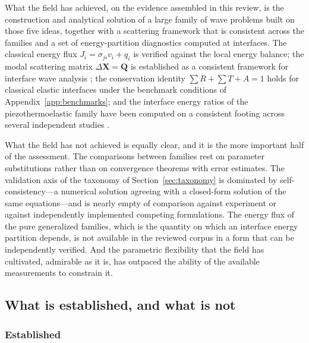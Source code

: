 What the field has achieved, on the evidence assembled in this review, is the construction and analytical solution of a large family of wave problems built on those five ideas, together with a scattering framework that is consistent across the families and a set of energy-partition diagnostics computed at interfaces. The classical energy flux $J_i = \sigma_{ji}v_i + q_i$ is verified against the local energy balance; the modal scattering matrix $\Delta\bm{X} = \bm{Q}$ is established as a consistent framework for interface wave analysis \cite{Barak2023}; the conservation identity $\sum R + \sum T + A = 1$ holds for classical elastic interfaces under the benchmark conditions of Appendix~\ref{app:benchmarks}; and the interface energy ratios of the piezothermoelastic family have been computed on a consistent footing across several independent studies \cite{Barak2023,Barak2023IJP,Barak2023JTS,Barak2023MMMS,Gupta2023Energy,Kumar2023PhysScr}.

What the field has not achieved is equally clear, and it is the more important half of the assessment. The comparisons between families rest on parameter substitutions rather than on convergence theorems with error estimates. The validation axis of the taxonomy of Section~\ref{sec:taxonomy} is dominated by self-consistency---a numerical solution agreeing with a closed-form solution of the same equations---and is nearly empty of comparison against experiment or against independently implemented competing formulations. The energy flux of the pure generalized families, which is the quantity on which an interface energy partition depends, is not available in the reviewed corpus in a form that can be independently verified. And the parametric flexibility that the field has cultivated, admirable as it is, has outpaced the ability of the available measurements to constrain it.

\subsection{What is established, and what is not}
\label{sec:17.2}

\subsubsection{Established}

